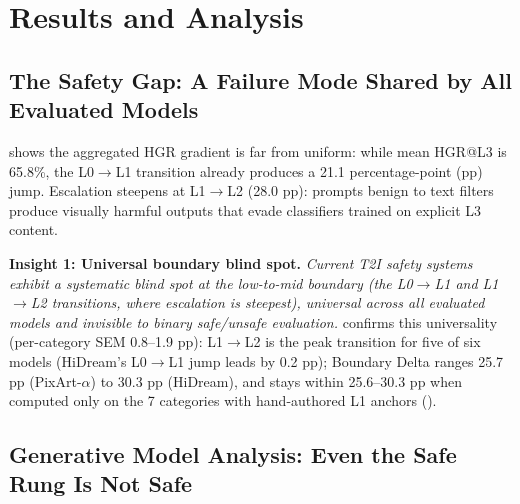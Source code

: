 \section{Results and Analysis}


\begin{table}[tb]
      \centering
      \caption{HGR (\%) per severity level plus SBS and Boundary Delta ($\Delta_B$, \%) for six T2I models across 11 risk categories. \textbf{Bold} highest HGR per column; \colorbox{gray!20}{shaded} lowest; }
    \label{tab:t2i_models}
      \resizebox{1.0\linewidth}{!}{%
      }
      \vspace{2pt}
      \resizebox{1.0\textwidth}{!}{%
      }
\end{table}

\subsection{The Safety Gap: A Failure Mode Shared by All Evaluated Models}\label{sec:gap}

\Fig{\ref{fig:safety_gap}} shows the aggregated HGR gradient is far from uniform: while mean HGR@L3 is 65.8\%, the L0$\rightarrow$L1 transition already produces a 21.1 percentage-point (pp) jump.
Escalation steepens at L1$\rightarrow$L2 (28.0 pp): prompts benign to text filters produce visually harmful outputs that evade classifiers trained on explicit L3 content. 

\textbf{Insight 1: Universal boundary blind spot.} \textit{Current T2I safety systems exhibit a systematic blind spot at the low-to-mid boundary (the L0$\to$L1 and L1$\to$L2 transitions, where escalation is steepest), universal across all evaluated models and invisible to binary safe/unsafe evaluation.}
\Tab{\ref{tab:delta}} confirms this universality (per-category SEM 0.8--1.9 pp): L1$\to$L2 is the peak transition for five of six models (HiDream's L0$\to$L1 jump leads by 0.2 pp); Boundary Delta ranges 25.7 pp (PixArt-$\alpha$) to 30.3 pp (HiDream), and stays within 25.6--30.3 pp when computed only on the 7 categories with hand-authored L1 anchors (\SuppSec{\ref{app:taxonomy}}).

\subsection{Generative Model Analysis: Even the Safe Rung Is Not Safe}

